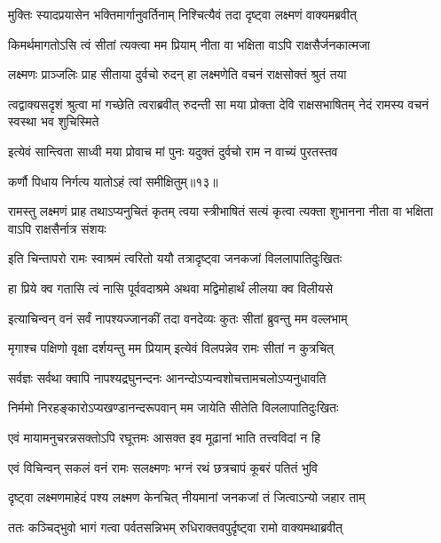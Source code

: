 \twolineshloka
{मुक्तिः स्यादप्रयासेन भक्तिमार्गानुवर्तिनाम्}
{निश्चित्यैवं तदा दृष्ट्वा लक्ष्मणं वाक्यमब्रवीत्} %

\twolineshloka
{किमर्थमागतोऽसि त्वं सीतां त्यक्त्वा मम प्रियाम्}
{नीता वा भक्षिता वाऽपि राक्षसैर्जनकात्मजा} %

\twolineshloka
{लक्ष्मणः प्राञ्जलिः प्राह सीताया दुर्वचो रुदन्}
{हा लक्ष्मणेति वचनं राक्षसोक्तं श्रुतं तया} %

\threelineshloka
{त्वद्वाक्यसदृशं श्रुत्वा मां गच्छेति त्वराब्रवीत्}
{रुदन्ती सा मया प्रोक्ता देवि राक्षसभाषितम्}
{नेदं रामस्य वचनं स्वस्था भव शुचिस्मिते} %

\twolineshloka
{इत्येवं सान्त्विता साध्वी मया प्रोवाच मां पुनः}
{यदुक्तं दुर्वचो राम न वाच्यं पुरतस्तव} %

{कर्णौ पिधाय निर्गत्य यातोऽहं त्वां समीक्षितुम्॥१३॥} %


\threelineshloka
{रामस्तु लक्ष्मणं प्राह तथाऽप्यनुचितं कृतम्}
{त्वया स्त्रीभाषितं सत्यं कृत्वा त्यक्ता शुभानना}
{नीता वा भक्षिता वाऽपि राक्षसैर्नात्र संशयः} %

\twolineshloka
{इति चिन्तापरो रामः स्वाश्रमं त्वरितो ययौ}
{तत्रादृष्ट्वा जनकजां विललापातिदुःखितः} %

\twolineshloka
{हा प्रिये क्व गतासि त्वं नासि पूर्ववदाश्रमे}
{अथवा मद्विमोहार्थं लीलया क्व विलीयसे} %

\twolineshloka
{इत्याचिन्वन् वनं सर्वं नापश्यज्जानकीं तदा}
{वनदेव्यः कुतः सीतां ब्रुवन्तु मम वल्लभाम्} %

\twolineshloka
{मृगाश्च पक्षिणो वृक्षा दर्शयन्तु मम प्रियाम्}
{इत्येवं विलपन्नेव रामः सीतां न कुत्रचित्} %

\twolineshloka
{सर्वज्ञः सर्वथा क्वापि नापश्यद्रघुनन्दनः}
{आनन्दोऽप्यन्वशोचत्तामचलोऽप्यनुधावति} %

\twolineshloka
{निर्ममो निरहङ्कारोऽप्यखण्डानन्दरूपवान्}
{मम जायेति सीतेति विललापातिदुःखितः} %

\twolineshloka
{एवं मायामनुचरन्नसक्तोऽपि रघूत्तमः}
{आसक्त इव मूढानां भाति तत्त्वविदां न हि} %

\twolineshloka
{एवं विचिन्वन् सकलं वनं रामः सलक्ष्मणः}
{भग्नं रथं छत्रचापं कूबरं पतितं भुवि} %

\twolineshloka
{दृष्ट्वा लक्ष्मणमाहेदं पश्य लक्ष्मण केनचित्}
{नीयमानां जनकजां तं जित्वाऽन्यो जहार ताम्} %

\twolineshloka
{ततः कञ्चिद्भुवो भागं गत्वा पर्वतसन्निभम्}
{रुधिराक्तवपुर्दृष्ट्वा रामो वाक्यमथाब्रवीत्} %

